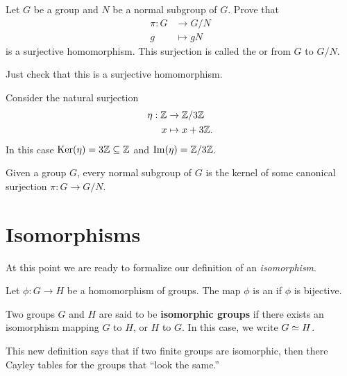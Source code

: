 \documentclass{ximera}
\begin{document}
\begin{theorem}
  Let $G$ be a group and $N$ be a normal subgroup of $G$. Prove that
  \begin{align*}
  \pi:G &\to G/N\\
  g &\mapsto gN
  \end{align*}
  is a surjective homomorphism. This surjection is called the
   or  from $G$ to
  $G/N$.
  \begin{sketch}
    Just check that this is a surjective homomorphism.
  \end{sketch}
\end{theorem}



\begin{example}
    Consider the natural surjection
  \begin{align*}
    \eta:\mathbb Z &\to \mathbb Z/3\mathbb Z\\
    x &\mapsto x+3\mathbb Z.
  \end{align*}
  In this case $\mathop{\mathrm{Ker}}\nolimits(\eta) = 3\mathbb Z \subseteq \mathbb Z$ and $\operatorname{Im}(\eta) = \mathbb Z/3\mathbb Z$.
\end{example}


\begin{corollary}
  Given a group $G$, every normal subgroup of $G$ is the kernel of
  some canonical surjection $\pi:G\to G/N$.
\end{corollary}




\section{Isomorphisms}

At this point we are ready to formalize our definition of an
\textit{isomorphism}.

\begin{definition}
  Let $\phi:G\to H$ be a homomorphism of groups. The map $\phi$ is an
   if $\phi$ is bijective.


  Two groups $G$ and $H$ are said to be \textbf{isomorphic groups} if
  there exists an isomorphism mapping $G$ to $H$, or $H$ to $G$.  In
  this case, we write $G\simeq H$.
\end{definition}


This new definition says that if two finite groups are isomorphic,
then there Cayley tables for the groups that ``look the same.''
\end{document}
